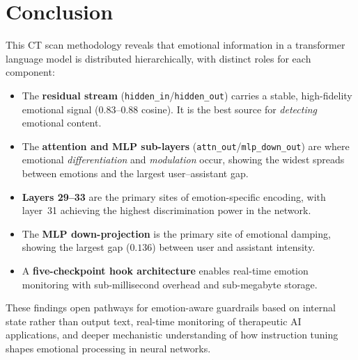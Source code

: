 \documentclass[11pt,a4paper]{article}
\begin{document}
\section{Conclusion}

This CT scan methodology reveals that emotional information in a transformer language model is distributed hierarchically, with distinct roles for each component:

\begin{itemize}[leftmargin=*]
  \item The \textbf{residual stream} (\texttt{hidden\_in}/\texttt{hidden\_out}) carries a stable, high-fidelity emotional signal ($0.83$--$0.88$ cosine). It is the best source for \emph{detecting} emotional content.
  \item The \textbf{attention and MLP sub-layers} (\texttt{attn\_out}/\texttt{mlp\_down\_out}) are where emotional \emph{differentiation} and \emph{modulation} occur, showing the widest spreads between emotions and the largest user--assistant gap.
  \item \textbf{Layers 29--33} are the primary sites of emotion-specific encoding, with layer~31 achieving the highest discrimination power in the network.
  \item The \textbf{MLP down-projection} is the primary site of emotional damping, showing the largest gap ($0.136$) between user and assistant intensity.
  \item A \textbf{five-checkpoint hook architecture} enables real-time emotion monitoring with sub-millisecond overhead and sub-megabyte storage.
\end{itemize}

These findings open pathways for emotion-aware guardrails based on internal state rather than output text, real-time monitoring of therapeutic AI applications, and deeper mechanistic understanding of how instruction tuning shapes emotional processing in neural networks.
\end{document}
